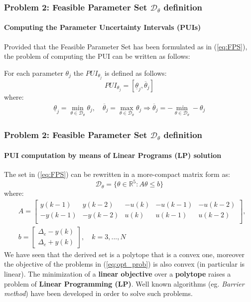\documentclass{beamer}
\begin{document}
\begin{frame}
    \frametitle{Problem 2: Feasible Parameter Set $\mathcal{D}_\theta$ definition}
    \framesubtitle{Computing the Parameter Uncertainty Intervals (PUIs)}
    Provided that the Feasible Parameter Set has been formulated as in (\ref{eq:FPS}), the problem of computing the PUI can be written as follows: 
    \begin{definition}
        For each parameter $\theta_j$ the $PUI_{\theta_j}$ is defined as follows:
        \begin{equation}
            PUI_{\theta_j} =[\underline{\theta}_j, \overline{\theta}_j]
        \end{equation}
        where: 
        \begin{align}\label{eq:opt_prob}
            \underline{\theta}_j = \min_{\theta\in\mathcal{D}_\theta} \theta_j, \quad 
            \overline{\theta}_j = \max_{\theta\in\mathcal{D}
            _\theta} \theta_j \Rightarrow 
            \overline{\theta}_j = -\min_{\theta\in\mathcal{D}_\theta} -\theta_j
        \end{align}
    \end{definition}
    
\end{frame}

\begin{frame}
    \frametitle{Problem 2: Feasible Parameter Set $\mathcal{D}_\theta$ definition}
    \framesubtitle{PUI computation by means of Linear Programs (LP) solution}
    The set in (\ref{eq:FPS}) can be rewritten in a more-compact matrix form as: 
    \begin{equation}
        \mathcal{D}_\theta = \{
            \theta \in \mathbb{R}^5: A\theta\le{b}
        \}
    \end{equation}
    where: 
    {\small{
        \begin{align*}
            &A=\begin{bmatrix}
                {y(k-1)}&{y(k-2)}&-{u(k)}&-{u(k-1)}&-{u(k-2)}\\
                -{y(k-1)}&-{y(k-2)}&{u(k)}&{u(k-1)}&{u(k-2)}\\
            \end{bmatrix}, \\
            &b=\begin{bmatrix}
                \Delta_e - y(k)\\
                \Delta_e + y(k)
            \end{bmatrix}, \quad 
            k=3,...,N
        \end{align*}
    }}We have seen that the derived set is a polytope that is a convex one, moreover the objective of the problems in (\ref{eq:opt_prob}) is also convex (in particular is linear). The \alert{minimization of a \textbf{linear objective} over a \textbf{polytope}} raises a problem of \alert{\textbf{Linear Programming (LP)}}. Well known algorithms (eg. \textit{Barrier method}) have been developed in order to solve such problems.
\end{frame}
\end{document}
